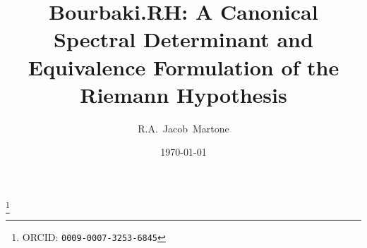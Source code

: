 
\title[Bourbaki.RH: A Spectral Reformulation of the Riemann Hypothesis]%
  {Bourbaki.RH: A Canonical Spectral Determinant and Equivalence Formulation of the Riemann Hypothesis}

\author[R.A.~Jacob~Martone]{R.A.~Jacob~Martone}
\address{Radio Park Area, Fresno, California, USA}
\thanks{ORCID: \texttt{0009-0007-3253-6845}}


\date{\today}
